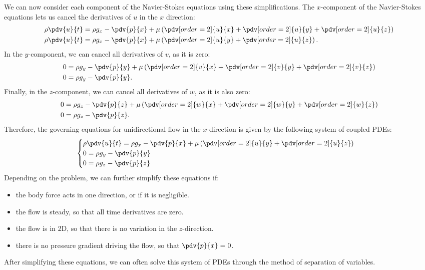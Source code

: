 \documentclass{article}
\theoremstyle{definition}
\begin{document}
We can now consider each component of the Navier-Stokes equations using
these simplifications. The \(x\)-component of the Navier-Stokes
equations lets us cancel the derivatives of \(u\) in the \(x\) direction:
\begin{align*}
    \rho \pdv{u}{t} & = \rho g_x - \pdv{p}{x} + \mu \left( \pdv[order=2]{u}{x} + \pdv[order=2]{u}{y} + \pdv[order=2]{u}{z} \right) \\
    \rho \pdv{u}{t} & = \rho g_x - \pdv{p}{x} + \mu \left( \pdv[order=2]{u}{y} + \pdv[order=2]{u}{z} \right).
\end{align*}
In the \(y\)-component, we can cancel all derivatives of \(v\), as it is
zero:
\begin{align*}
    0 & = \rho g_y -\pdv{p}{y} + \mu \left( \pdv[order=2]{v}{x} + \pdv[order=2]{v}{y} + \pdv[order=2]{v}{z} \right) \\
    0 & = \rho g_y -\pdv{p}{y}.
\end{align*}
Finally, in the \(z\)-component, we can cancel all derivatives of \(w\),
as it is also zero:
\begin{align*}
    0 & = \rho g_z -\pdv{p}{z} + \mu \left( \pdv[order=2]{w}{x} + \pdv[order=2]{w}{y} + \pdv[order=2]{w}{z} \right) \\
    0 & = \rho g_z -\pdv{p}{z}.
\end{align*}
Therefore, the governing equations for unidirectional flow in the
\(x\)-direction is given by the following system of coupled PDEs:
\begin{equation*}
    \begin{cases}
        \displaystyle \rho \pdv{u}{t} = \rho g_x - \pdv{p}{x} + \mu \left( \pdv[order=2]{u}{y} + \pdv[order=2]{u}{z} \right) \\
        \displaystyle 0 = \rho g_y -\pdv{p}{y}                                                                               \\
        \displaystyle 0 = \rho g_z -\pdv{p}{z}
    \end{cases}
\end{equation*}
Depending on the problem, we can further simplify these equations if:
\begin{itemize}
    \item the body force acts in one direction, or if it is negligible.
    \item the flow is steady, so that all time derivatives are zero.
    \item the flow is in 2D, so that there is no variation in the
          \(z\)-direction.
    \item there is no pressure gradient driving the flow, so that
          \(\displaystyle\pdv{p}{x} = 0\).
\end{itemize}
After simplifying these equations, we can often solve this system of
PDEs through the method of separation of variables.
\end{document}
